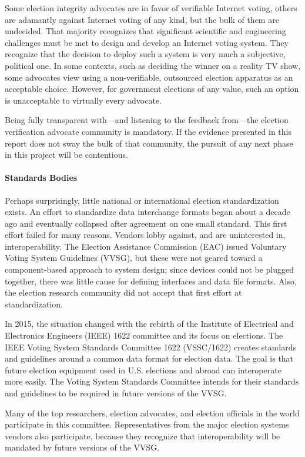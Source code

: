 Some election integrity advocates are in favor of verifiable Internet
voting, others are adamantly against Internet voting of any kind, but
the bulk of them are undecided. That majority recognizes that
significant scientific and engineering challenges must be met to
design and develop an Internet voting system. They recognize that the
decision to deploy such a system is very much a subjective, political
one. In some contexts, such as deciding the winner on a reality TV
show, some advocates view using a non-verifiable, outsourced election
apparatus as an acceptable choice. However, for government elections
of any value, such an option is unacceptable to virtually every
advocate.

Being fully transparent with---and listening to the feedback
from---the election verification advocate community is mandatory. If
the evidence presented in this report does not sway the bulk of that
community, the pursuit of any next phase in this project will be
contentious.

\paragraph{Standards Bodies} 
Perhaps surprisingly, little national or international election
standardization exists. An effort to standardize data interchange
formats began about a decade ago and eventually collapsed after
agreement on one small standard. This first effort failed for many
reasons. Vendors lobby against, and are uninterested in,
interoperability. The Election Assistance Commission (EAC) issued
Voluntary Voting System Guidelines (VVSG), but these were not geared
toward a component-based approach to system design; since devices
could not be plugged together, there was little cause for defining
interfaces and data file formats. Also, the election research
community did not accept that first effort at standardization.

In 2015, the situation changed with the rebirth of the Institute of
Electrical and Electronics Engineers (IEEE) 1622 committee and its
focus on elections. The IEEE Voting System Standards Committee 1622
(VSSC/1622) creates standards and guidelines around a common data
format for election data. The goal is that future election equipment
used in U.S. elections and abroad can interoperate more easily. The
Voting System Standards Committee intends for their standards and
guidelines to be required in future versions of the VVSG.

Many of the top researchers, election advocates, and election
officials in the world participate in this committee. Representatives
from the major election systems vendors also participate, because they
recognize that interoperability will be mandated by future versions of
the VVSG.

